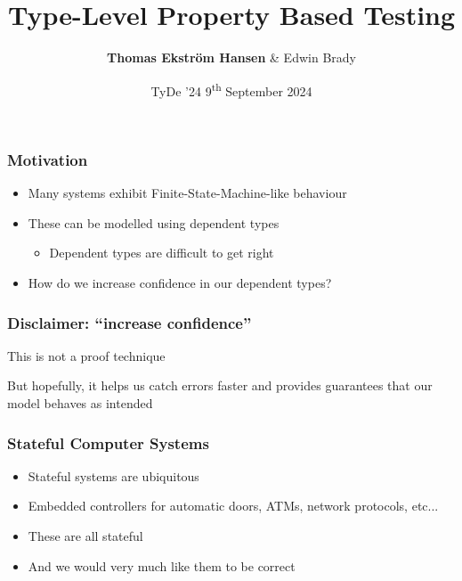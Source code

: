 \documentclass[compress]{beamer}
\title{Type-Level Property Based Testing}
\author{{\bfseries Thomas Ekstr{\" o}m Hansen} \& Edwin Brady}
\date{TyDe '24 {\textemdash} 9\textsuperscript{th} September 2024}
\begin{document}
\maketitle


\begin{frame}
  \frametitle{Motivation}

  \large

  \begin{itemize}
    \item<1-> Many systems exhibit Finite-State-Machine-like behaviour
    \item<2-> These can be modelled using dependent types
    \begin{itemize}
      \item<3-> Dependent types are difficult to get right
    \end{itemize}
    \item<4-> How do we increase confidence in our dependent types?
  \end{itemize}

\end{frame}


\begin{frame}
  \frametitle{Disclaimer: ``increase confidence''}

  \begin{center}
    {\Large
    This is not a proof technique
    }

    {\large
    But hopefully, it helps us catch errors faster and provides guarantees that
    our model behaves as intended
    }
  \end{center}

\end{frame}


\begin{frame}
  \frametitle{Stateful Computer Systems}

  \large

  \begin{itemize}
    \item<1-> Stateful systems are ubiquitous
    \item<2-> Embedded controllers for automatic doors, ATMs, network protocols,
              etc...
    \item<3-> These are all stateful
    \item<4-> And we would very much like them to be correct
  \end{itemize}

\end{frame}
\end{document}
